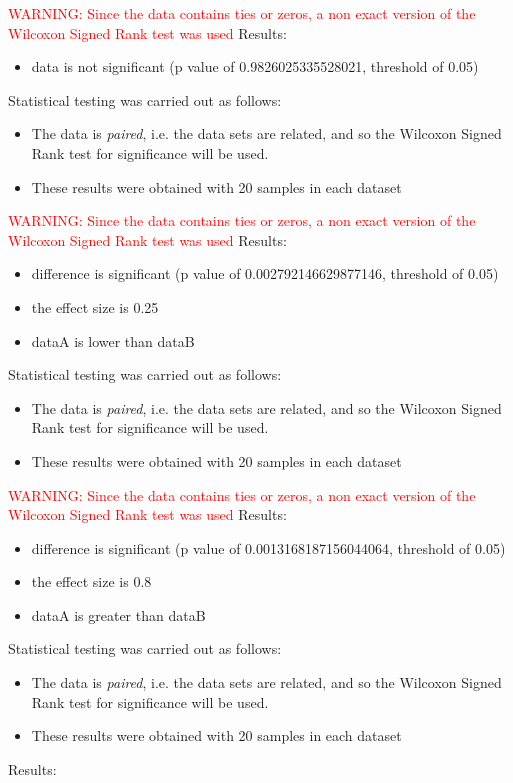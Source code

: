 \documentclass[]{article}
\begin{document}
\textcolor{Red}{WARNING: Since the data contains ties or zeros, a non exact version of the Wilcoxon Signed Rank test was used
}
Results:
\begin{itemize}
\item{data is not significant (p value of 0.9826025335528021, threshold of 0.05)}
\end{itemize}Statistical testing was carried out as follows: \begin{itemize}
\item{The data is \textit{paired}, i.e. the data sets are related, and so the Wilcoxon Signed Rank test for significance will be used.}
\item{These results were obtained with 20 samples in each dataset}
\end{itemize}
\textcolor{Red}{WARNING: Since the data contains ties or zeros, a non exact version of the Wilcoxon Signed Rank test was used
}
Results:
\begin{itemize}
\item{difference is significant (p value of 0.002792146629877146, threshold of 0.05)}
\item{the effect size is 0.25}
\item{dataA is lower than dataB}
\end{itemize}Statistical testing was carried out as follows: \begin{itemize}
\item{The data is \textit{paired}, i.e. the data sets are related, and so the Wilcoxon Signed Rank test for significance will be used.}
\item{These results were obtained with 20 samples in each dataset}
\end{itemize}
\textcolor{Red}{WARNING: Since the data contains ties or zeros, a non exact version of the Wilcoxon Signed Rank test was used
}
Results:
\begin{itemize}
\item{difference is significant (p value of 0.0013168187156044064, threshold of 0.05)}
\item{the effect size is 0.8}
\item{dataA is greater than dataB}
\end{itemize}Statistical testing was carried out as follows: \begin{itemize}
\item{The data is \textit{paired}, i.e. the data sets are related, and so the Wilcoxon Signed Rank test for significance will be used.}
\item{These results were obtained with 20 samples in each dataset}
\end{itemize}Results:
\end{document}
